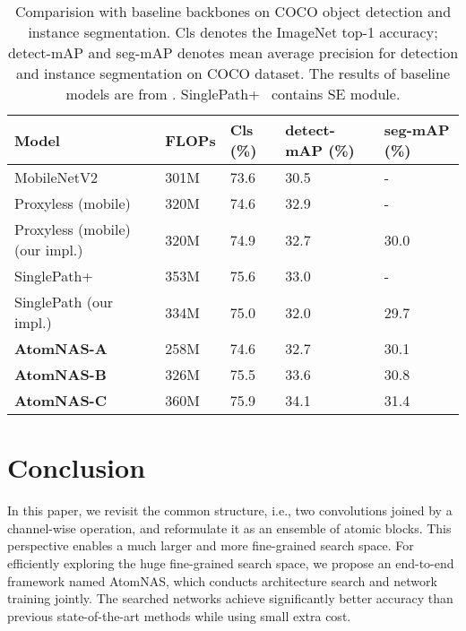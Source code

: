 \documentclass{article} \usepackage{iclr2020_conference,times}
\newcommand{\flops}{FLOPs\xspace}
\begin{document}
\begin{table}[htbp]
\caption{Comparision with baseline backbones on COCO object detection and instance segmentation. Cls denotes the ImageNet top-1 accuracy; detect-mAP and seg-mAP denotes mean average precision for detection and instance segmentation on COCO dataset. The results of baseline models are from \cite{stamoulis2019single_path_automl}. SinglePath+~\citep{stamoulis2019single_path_automl} contains SE module.}
\begin{center}
\begin{tabular}{lllll}
\toprule
Model & \flops & Cls (\%) & detect-mAP (\%) & seg-mAP (\%)  \\
\midrule
MobileNetV2 \citep{sandler2018mobilenetv2}                           & 301M & 73.6 & 30.5 & - \\
\midrule
Proxyless (mobile) \citep{han2019proxyless}                  & 320M & 74.6 & 32.9 & - \\
Proxyless (mobile) (our impl.)                  & 320M & 74.9 & 32.7 & 30.0 \\
SinglePath+ \citep{stamoulis2019single_path_automl} & 353M & 75.6 & 33.0 & - \\
SinglePath (our impl.) & 334M & 75.0 & 32.0 & 29.7 \\
\midrule
\textbf{AtomNAS-A}  & 258M & 74.6 & 32.7 & 30.1 \\
\textbf{AtomNAS-B}  & 326M & 75.5 & 33.6 & 30.8 \\
\textbf{AtomNAS-C}  & 360M & 75.9 & 34.1 & 31.4 \\
\bottomrule

\end{tabular}
\end{center}
\label{tab:detection}
\end{table}




\section{Conclusion}
In this paper, we revisit the common structure, i.e., two convolutions joined by a channel-wise operation, and reformulate it as an ensemble of atomic blocks. This perspective enables a much larger and more fine-grained search space. For efficiently exploring the huge fine-grained search space, we propose an end-to-end framework named AtomNAS, which conducts architecture search and network training jointly. The searched networks achieve significantly better accuracy than previous state-of-the-art methods while using small extra cost.
\end{document}
